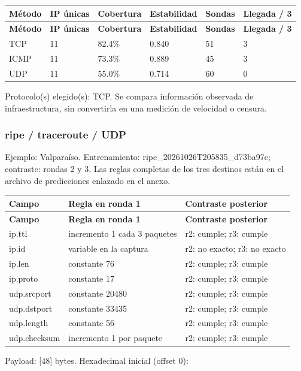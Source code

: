\endgroup
\begingroup
\fontsize{9}{11}\selectfont
\addtocounter{table}{-1}
\begin{longtable}{p{3.1cm}p{1.9cm}p{2.1cm}p{2.1cm}p{1.8cm}p{2.1cm}}
\toprule
\textbf{Método} & \textbf{IP únicas} & \textbf{Cobertura} & \textbf{Estabilidad} & \textbf{Sondas} & \textbf{Llegada / 3} \\ \midrule
\endfirsthead
\toprule
\textbf{Método} & \textbf{IP únicas} & \textbf{Cobertura} & \textbf{Estabilidad} & \textbf{Sondas} & \textbf{Llegada / 3} \\ \midrule
\endhead
TCP & 11 & 82.4\% & 0.840 & 51 & 3 \\
ICMP & 11 & 73.3\% & 0.889 & 45 & 3 \\
UDP & 11 & 55.0\% & 0.714 & 60 & 0 \\
\bottomrule
\end{longtable}
\endgroup
Protocolo(s) elegido(s): TCP. Se compara información observada de infraestructura, sin convertirla en una medición de velocidad o censura.

\subsubsection{ripe / traceroute / UDP}
Ejemplo: Valparaíso. Entrenamiento: ripe\_\allowbreak{}20261026T205835\_\allowbreak{}d73ba97e; contraste: rondas 2 y 3. Las reglas completas de los tres destinos están en el archivo de predicciones enlazado en el anexo.

\begingroup
\fontsize{9}{11}\selectfont
\addtocounter{table}{-1}
\begin{longtable}{p{3.1cm}p{5.8cm}p{5.1cm}}
\toprule
\textbf{Campo} & \textbf{Regla en ronda 1} & \textbf{Contraste posterior} \\ \midrule
\endfirsthead
\toprule
\textbf{Campo} & \textbf{Regla en ronda 1} & \textbf{Contraste posterior} \\ \midrule
\endhead
ip.ttl & incremento 1 cada 3 paquetes & r2: cumple; r3: cumple \\
ip.id & variable en la captura & r2: no exacto; r3: no exacto \\
ip.len & constante 76 & r2: cumple; r3: cumple \\
ip.proto & constante 17 & r2: cumple; r3: cumple \\
udp.srcport & constante 20480 & r2: cumple; r3: cumple \\
udp.dstport & constante 33435 & r2: cumple; r3: cumple \\
udp.length & constante 56 & r2: cumple; r3: cumple \\
udp.checksum & incremento 1 por paquete & r2: cumple; r3: cumple \\
\bottomrule
\end{longtable}
\endgroup
Payload: [48] bytes. Hexadecimal inicial (offset 0):

